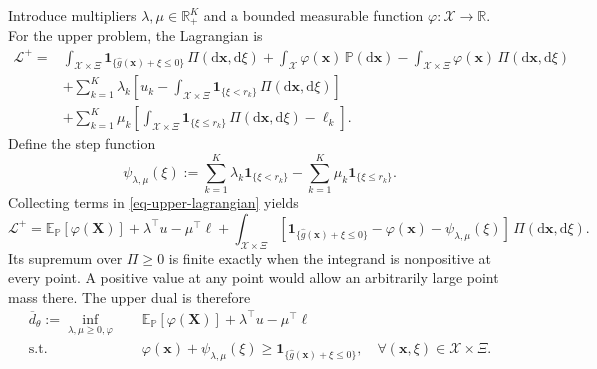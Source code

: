 \documentclass[review,11pt,3p,authoryear,nopreprintline]{elsarticle}
\begin{document}
Introduce multipliers $\lambda,\mu\in\mathbb R_+^K$ and a bounded measurable function $\varphi:\mathcal X\to\mathbb R$. For the upper problem, the Lagrangian is
\begin{equation}
  \begin{aligned}
    \mathcal L^+={}&
    \int_{\mathcal X\times\Xi}\mathbf1_{\{\hat g(\bm x)+\xi\le0\}}\,\Pi(\mathrm d\bm x,\mathrm d\xi)
    +\int_{\mathcal X}\varphi(\bm x)\,\mathbb P(\mathrm d\bm x)
    -\int_{\mathcal X\times\Xi}\varphi(\bm x)\,\Pi(\mathrm d\bm x,\mathrm d\xi)\\
    &+\sum_{k=1}^K\lambda_k
    \left[u_k-\int_{\mathcal X\times\Xi}\mathbf1_{\{\xi<r_k\}}\,\Pi(\mathrm d\bm x,\mathrm d\xi)\right]\\
    &+\sum_{k=1}^K\mu_k
    \left[\int_{\mathcal X\times\Xi}\mathbf1_{\{\xi\le r_k\}}\,\Pi(\mathrm d\bm x,\mathrm d\xi)-\ell_k\right].
  \end{aligned}
  \label{eq-upper-lagrangian}
\end{equation}
Define the step function
\begin{equation}
  \psi_{\lambda,\mu}(\xi):=
  \sum_{k=1}^K\lambda_k\mathbf1_{\{\xi<r_k\}}
  -\sum_{k=1}^K\mu_k\mathbf1_{\{\xi\le r_k\}}.
  \label{eq-dual-step-function}
\end{equation}
Collecting terms in \eqref{eq-upper-lagrangian} yields
\[
  \mathcal L^+
  =
  \mathbb E_{\mathbb P}[\varphi(\bm X)]
  +\lambda^\top u-\mu^\top\ell
  +\int_{\mathcal X\times\Xi}
  \left[\mathbf1_{\{\hat g(\bm x)+\xi\le0\}}-\varphi(\bm x)
  -\psi_{\lambda,\mu}(\xi)\right]\,\Pi(\mathrm d\bm x,\mathrm d\xi).
\]
Its supremum over $\Pi\ge0$ is finite exactly when the integrand is nonpositive at every point. A positive value at any point would allow an arbitrarily large point mass there. The upper dual is therefore
\begin{equation}
  \begin{aligned}
    \overline d_\theta:=\inf_{\lambda,\mu\ge0,\varphi}\quad&
    \mathbb E_{\mathbb P}[\varphi(\bm X)]
    +\lambda^\top u-\mu^\top\ell\\
    \text{s.t.}\quad&
    \varphi(\bm x)+\psi_{\lambda,\mu}(\xi)
    \ge\mathbf1_{\{\hat g(\bm x)+\xi\le0\}},
    \quad\forall(\bm x,\xi)\in\mathcal X\times\Xi.
  \end{aligned}
  \label{eq-upper-measure-dual}
\end{equation}
\end{document}
